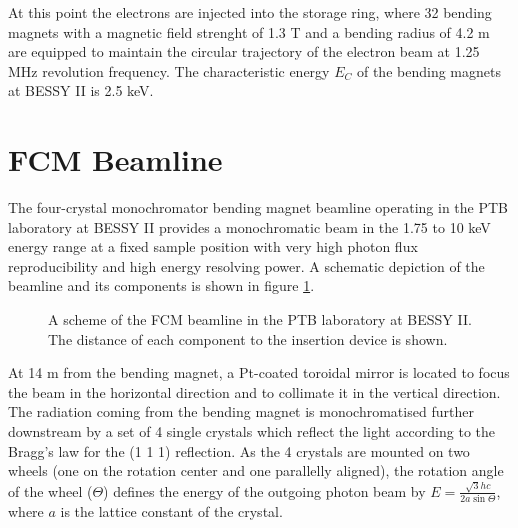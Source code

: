 At this point the electrons are injected into the storage ring, where 32 bending magnets with a magnetic field strenght of 1.3 T and a bending radius of 4.2 m \citep{klein_elektronenspeicherringe_2014} are equipped to maintain the circular trajectory of the electron beam at 1.25 MHz revolution frequency. The characteristic energy $E_C$ of the bending magnets at BESSY II is 2.5 keV. 


\section{FCM Beamline}
\label{sec:fcm}

The four-crystal monochromator bending magnet beamline operating in the PTB laboratory at BESSY II \citep{krumrey_design_1998, krumrey_high-accuracy_2001} provides a monochromatic beam in the 1.75 to 10 keV energy range at a fixed sample position with very high photon flux reproducibility and high energy resolving power. A schematic depiction of the beamline and its components is shown in figure \ref{fig:FCMScheme}.

\begin{figure}%
	\centering
		\caption{A scheme of the FCM beamline in the PTB laboratory at BESSY II. The distance of each component to the insertion device is shown.}
		\label{fig:FCMScheme}
\end{figure}

At 14 m from the bending magnet, a Pt-coated toroidal mirror is located to focus the beam in the horizontal direction and to collimate it in the vertical direction. The radiation coming from the bending magnet is monochromatised further downstream by a set of 4 single crystals which reflect the light according to the Bragg's law for the (1 1 1) reflection. As the 4 crystals are mounted on two wheels (one on the rotation center and one parallelly aligned), the rotation angle of the wheel ($\Theta$) defines the energy of the outgoing photon beam by $E=\frac{\sqrt{3}h c}{2a\sin{\Theta}}$, where $a$ is the lattice constant of the crystal.

